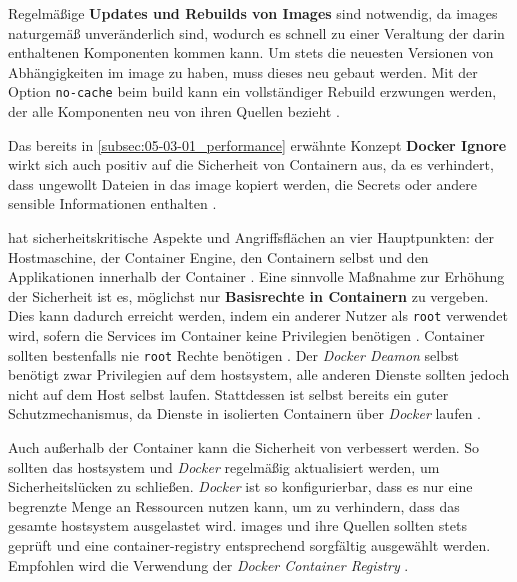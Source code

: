 Regelmäßige \textbf{Updates und Rebuilds von Images} sind notwendig, da \Glspl{image} naturgemäß unveränderlich sind, wodurch es schnell zu einer Veraltung der darin enthaltenen Komponenten kommen kann. Um stets die neuesten Versionen von Abhängigkeiten im \Gls{image} zu haben, muss dieses neu gebaut werden. Mit der Option \texttt{no-cache} beim \Gls{build} kann ein vollständiger Rebuild erzwungen werden, der alle Komponenten neu von ihren Quellen bezieht \cite{300:Building-Best-Practices}.

Das bereits in \autoref{subsec:05-03-01_performance} erwähnte Konzept \textbf{Docker Ignore} wirkt sich auch positiv auf die Sicherheit von Containern aus, da es verhindert, dass ungewollt Dateien in das \Gls{image} kopiert werden, die Secrets oder andere sensible Informationen enthalten \cite{300:Building-Best-Practices}.

 hat sicherheitskritische Aspekte und Angriffsflächen an vier Hauptpunkten: der Hostmaschine, der Container Engine, den Containern selbst und den Applikationen innerhalb der Container \cite{021:Docker-Security-Threat-Model-and-Best-Practices}. Eine sinnvolle Maßnahme zur Erhöhung der Sicherheit ist es, möglichst nur \textbf{Basisrechte in Containern} zu vergeben. Dies kann dadurch erreicht werden, indem ein anderer Nutzer als \texttt{root} verwendet wird, sofern die Services im Container keine Privilegien benötigen \cite{021:Docker-Security-Threat-Model-and-Best-Practices,024:Investiugating-Impact-of-Containerization-on-Deployment-Process-in-DevOps,300:Building-Best-Practices}. Container sollten bestenfalls nie \texttt{root} Rechte benötigen \cite{022:Automated-Cloud-Infrastructure-Continuous-Integration-and-Continuous-Delivery-using-Docker}. Der \textit{Docker Deamon} selbst benötigt zwar Privilegien auf dem \Gls{hostsystem}, alle anderen Dienste sollten jedoch nicht auf dem Host selbst laufen. Stattdessen ist  selbst bereits ein guter Schutzmechanismus, da Dienste in isolierten Containern über \textit{Docker} laufen \cite{022:Automated-Cloud-Infrastructure-Continuous-Integration-and-Continuous-Delivery-using-Docker}.

Auch außerhalb der Container kann die Sicherheit von  verbessert werden. So sollten das \Gls{hostsystem} und \textit{Docker} regelmäßig aktualisiert werden, um Sicherheitslücken zu schließen. \textit{Docker} ist so konfigurierbar, dass es nur eine begrenzte Menge an Ressourcen nutzen kann, um zu verhindern, dass das gesamte \Gls{hostsystem} ausgelastet wird. \Glspl{image} und ihre Quellen sollten stets geprüft und eine \Gls{container-registry} entsprechend sorgfältig ausgewählt werden. Empfohlen wird die Verwendung der \textit{Docker Container Registry} \cite{021:Docker-Security-Threat-Model-and-Best-Practices}.

